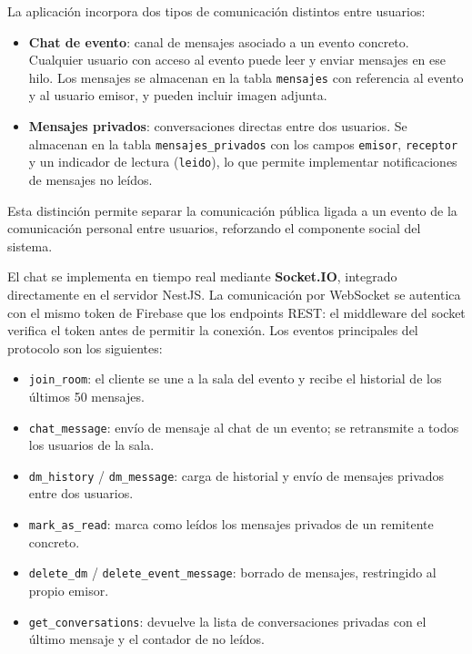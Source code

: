 La aplicación incorpora dos tipos de comunicación distintos entre usuarios:

\begin{itemize}
    \item \textbf{Chat de evento}: canal de mensajes asociado a un evento concreto. Cualquier usuario con acceso al evento puede leer y enviar mensajes en ese hilo. Los mensajes se almacenan en la tabla \texttt{mensajes} con referencia al evento y al usuario emisor, y pueden incluir imagen adjunta.
    \item \textbf{Mensajes privados}: conversaciones directas entre dos usuarios. Se almacenan en la tabla \texttt{mensajes\_privados} con los campos \texttt{emisor}, \texttt{receptor} y un indicador de lectura (\texttt{leido}), lo que permite implementar notificaciones de mensajes no leídos.
\end{itemize}

Esta distinción permite separar la comunicación pública ligada a un evento de la comunicación personal entre usuarios, reforzando el componente social del sistema.

El chat se implementa en tiempo real mediante \textbf{Socket.IO}, integrado directamente en el servidor NestJS. La comunicación por WebSocket se autentica con el mismo token de Firebase que los endpoints REST: el middleware del socket verifica el token antes de permitir la conexión. Los eventos principales del protocolo son los siguientes:

\begin{itemize}
    \item \texttt{join\_room}: el cliente se une a la sala del evento y recibe el historial de los últimos 50 mensajes.
    \item \texttt{chat\_message}: envío de mensaje al chat de un evento; se retransmite a todos los usuarios de la sala.
    \item \texttt{dm\_history} / \texttt{dm\_message}: carga de historial y envío de mensajes privados entre dos usuarios.
    \item \texttt{mark\_as\_read}: marca como leídos los mensajes privados de un remitente concreto.
    \item \texttt{delete\_dm} / \texttt{delete\_event\_message}: borrado de mensajes, restringido al propio emisor.
    \item \texttt{get\_conversations}: devuelve la lista de conversaciones privadas con el último mensaje y el contador de no leídos.
\end{itemize}

